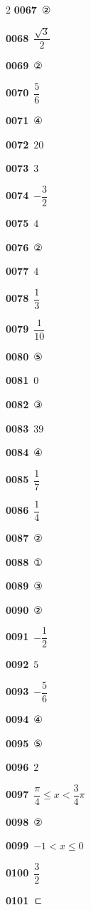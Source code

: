 \documentclass[10pt,a4paper]{article}
\begin{document}
\begin{multicols}{2}
\noindent\textbf{0067}\ ②\par
\noindent\textbf{0068}\ $\dfrac{\sqrt{3}}{2}$\par
\noindent\textbf{0069}\ ②\par
\noindent\textbf{0070}\ $\dfrac{5}{6}$\par
\noindent\textbf{0071}\ ④\par
\noindent\textbf{0072}\ $20$\par
\noindent\textbf{0073}\ $3$\par
\noindent\textbf{0074}\ $-\dfrac{3}{2}$\par
\noindent\textbf{0075}\ $4$\par
\noindent\textbf{0076}\ ②\par
\noindent\textbf{0077}\ $4$\par
\noindent\textbf{0078}\ $\dfrac{1}{3}$\par
\noindent\textbf{0079}\ $\dfrac{1}{10}$\par
\noindent\textbf{0080}\ ⑤\par
\noindent\textbf{0081}\ $0$\par
\noindent\textbf{0082}\ ③\par
\noindent\textbf{0083}\ $39$\par
\noindent\textbf{0084}\ ④\par
\noindent\textbf{0085}\ $\dfrac{1}{7}$\par
\noindent\textbf{0086}\ $\dfrac{1}{4}$\par
\noindent\textbf{0087}\ ②\par
\noindent\textbf{0088}\ ①\par
\noindent\textbf{0089}\ ③\par
\noindent\textbf{0090}\ ②\par
\noindent\textbf{0091}\ $-\dfrac{1}{2}$\par
\noindent\textbf{0092}\ $5$\par
\noindent\textbf{0093}\ $-\dfrac{5}{6}$\par
\noindent\textbf{0094}\ ④\par
\noindent\textbf{0095}\ ⑤\par
\noindent\textbf{0096}\ $2$\par
\noindent\textbf{0097}\ $\dfrac{\pi}{4}\le x<\dfrac{3}{4}\pi$\par
\noindent\textbf{0098}\ ②\par
\noindent\textbf{0099}\ $-1<x\le 0$\par
\noindent\textbf{0100}\ $\dfrac{3}{2}$\par
\noindent\textbf{0101}\ ㄷ\par

\end{multicols}
\end{document}
